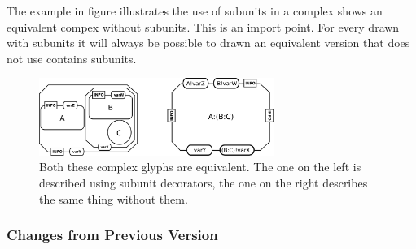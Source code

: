 The example in figure  illustrates the use of
subunits in a complex shows an equivalent compex without
subunits. This is an import point. For every  drawn
with subunits it will always be possible to drawn an equivalent
version that does not use contains subunits.

\begin{figure}[H]
  \centering
  \includegraphics[width = 3.0in]{images/complex}
  \caption{Both these complex glyphs are equivalent. The one on the
    left is described using subunit decorators, the one on the right
    describes the same thing without them.}
  \label{fig:complexSubunits}
\end{figure}

\subsubsection{Changes from Previous Version}









